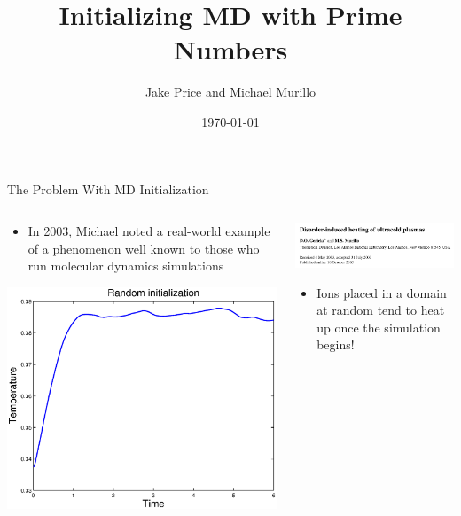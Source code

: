 \documentclass{beamer}
\title{Initializing MD with Prime Numbers}
\author[Price and Shohet]{Jake Price and Michael Murillo}
\institute[CPSSW]{Computational Physics Student Summer Workshop}
\date{\today}
\begin{document}
	\begin{frame}
		\titlepage
	\end{frame}
	
	

	
	\begin{frame}{The Problem With MD Initialization}
	\begin{columns}
	\begin{column}{0.5\textwidth}
			\begin{itemize}
			\vspace{1em}
			\item In 2003, Michael noted a real-world example of a phenomenon well known to those who run molecular dynamics simulations
			\end{itemize}\vspace{2em}
			
			\includegraphics[width=\linewidth]{disorderinducedheating.eps}
			
			\end{column}
			\begin{column}{0.6\textwidth}
			\includegraphics[width=\linewidth]{disorderinducedheating.png}\vspace{4em}
			\begin{itemize}
			\item Ions placed in a domain at random tend to heat up once the simulation begins!
			\end{itemize}
			\end{column}
			\end{columns}
	\end{frame}
	
\end{document}
